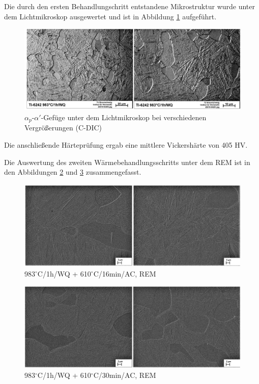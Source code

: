 Die durch den ersten Behandlungschritt entstandene Mikrostruktur wurde unter dem Lichtmikroskop ausgewertet und ist in Abbildung \ref{fig:abbildung-19} aufgeführt.

\begin{figure}[h]
	\centering
	\includegraphics[width=1.0\linewidth]{./Bilder/Abbildung 19.png}
	\caption[Abbildung 19]{$\alpha_p$-$\alpha'$-Gefüge unter dem Lichtmikroskop bei verschiedenen Vergrößerungen (C-DIC)}
	\label{fig:abbildung-19}
\end{figure}

Die anschließende Härteprüfung ergab eine mittlere Vickershärte von 405 HV.

Die Auswertung des zweiten Wärmebehandlungsschritts unter dem REM ist in den Abbildungen \ref{fig:abbildung-26} und \ref{fig:abbildung-27} zusammengefasst.

\begin{figure}[h]
	\centering
	\includegraphics[width=1.0\linewidth]{./Bilder/Abbildung 26.png}
	\caption[Abbildung 26]{983$^\circ$C/1h/WQ + 610$^\circ$C/16min/AC, REM}
	\label{fig:abbildung-26}
\end{figure}

\begin{figure}[h]
	\centering
	\includegraphics[width=1.0\linewidth]{./Bilder/Abbildung 27.png}
	\caption[Abbildung 27]{983$^\circ$C/1h/WQ + 610$^\circ$C/30min/AC, REM}
	\label{fig:abbildung-27}
\end{figure}

